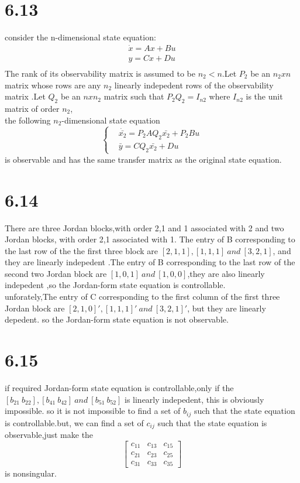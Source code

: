 \documentclass{article}
\begin{document}
\section*{6.13}
consider the n-dimensional state equation:
\[
\begin{split}
    \dot{x}=Ax+Bu\\
    y=Cx+Du\\
\end{split}    
\]
The rank of its observability matrix is assumed to be $n_2<n$.Let $P_2$ be an $n_2xn$ matrix whose rows are any
$n_2$ linearly indepedent rows of the observability matrix .Let $Q_2$ be an $nxn_2$ matrix such that $P_2Q_2=I_{n2}$
where $I_{n2}$ is the unit matrix of order $n_2$,\\
the following $n_2$-dimensional state equation\\ 
\[
\left\{
\begin{aligned}
    &\dot{\bar{x_2}}=P_2AQ_2\bar{x_2}+P_2Bu\\
    &\bar{y}=CQ_2\bar{x_2}+Du
\end{aligned}
\right.   
\]
is observable and has the same transfer matrix as the original state equation.

\section*{6.14}
There are three Jordan blocks,with order 2,1 and 1 associated with 2 and two Jordan blocks, with order 2,1 associated with 1.
The entry of B corresponding to the last row of the the first three block are 
$[2,1,1],[1,1,1]\ and\ [3,2,1]$, and they are linearly indepedent .The entry of B corresponding to the last row of the second two Jordan block are $[1,0,1]\ and\ [1,0,0]$,they are also linearly indepedent ,so the Jordan-form state equation is controllable.\\
unforately,The entry of C corresponding to the first column of the first three Jordan block are $[2,1,0]' ,[1,1,1]'\ and\ [3,2,1]'$, but they are linearly depedent.
so the Jordan-form state equation is not observable.

\section*{6.15}
if required Jordan-form state equation is controllable,only if the $[b_{21}\ b_{22}],[b_{41}\ b_{42}]\ and\ [b_{51}\ b_{52}]$ is linearly indepedent, this is obviously impossible.
so it is not impossible to find a set of $b_{ij}$ such that the state equation is controllable.but, we can find a set of $c_{ij}$ such that the state equation is observable,just make the 
\[
\left[
    \begin{array}{ccc}
        c_{11} & c_{13} & c_{15}\\
        c_{21} & c_{23} & c_{25}\\
        c_{31} & c_{33} & c_{35}
    \end{array}
\right]    
\]
is nonsingular.
\end{document}
